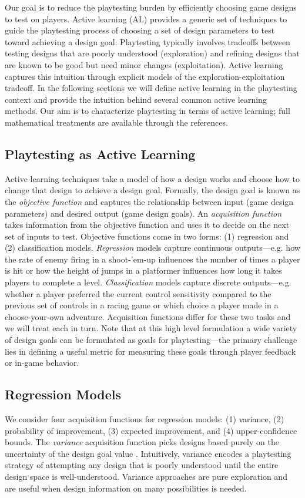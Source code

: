 \documentclass{sig-alternate}
\begin{document}
Our goal is to reduce the playtesting burden by efficiently choosing game designs to test on players.
Active learning (AL) provides a generic set of techniques to guide the playtesting process of choosing a set of design parameters to test toward achieving a design goal.
Playtesting typically involves tradeoffs between testing designs that are poorly understood (exploration) and refining designs that are known to be good but need minor changes (exploitation).
Active learning captures this intuition through explicit models of the exploration-exploitation tradeoff.
In the following sections we will define active learning in the playtesting context and provide the intuition behind several common active learning methods.
Our aim is to characterize playtesting in terms of active learning; full mathematical treatments are available through the references.


\subsection{Playtesting as Active Learning}
Active learning techniques take a model of how a design works and choose how to change that design to achieve a design goal.
Formally, the design goal is known as the \textit{objective function} and captures the relationship between input (game design parameters) and desired output (game design goals).
An \textit{acquisition function} takes information from the objective function and uses it to decide on the next set of inputs to test.
Objective functions come in two forms: (1) regression and (2) classification models.
\textit{Regression} models capture continuous outputs---e.g. how the rate of enemy firing in a shoot-'em-up influences the number of times a player is hit or how the height of jumps in a platformer influences how long it takes players to complete a level.
\textit{Classification} models capture discrete outputs---e.g. whether a player preferred the current control sensitivity compared to the previous set of controls in a racing game or which choice a player made in a choose-your-own adventure.
Acquisition functions differ for these two tasks and we will treat each in turn.
Note that at this high level formulation a wide variety of design goals can be formulated as goals for playtesting---the primary challenge lies in defining a useful metric for measuring these goals through player feedback or in-game behavior.


\subsection{Regression Models}
We consider four acquisition functions for regression models: (1) variance, (2) probability of improvement, (3) expected improvement, and (4) upper-confidence bounds.
The \textit{variance} acquisition function picks designs based purely on the uncertainty of the design goal value \cite{brochu2010:thesis}.
Intuitively, variance encodes a playtesting strategy of attempting any design that is poorly understood until the entire design space is well-understood.
Variance approaches are pure exploration and are useful when design information on many possibilities is needed.
\end{document}
